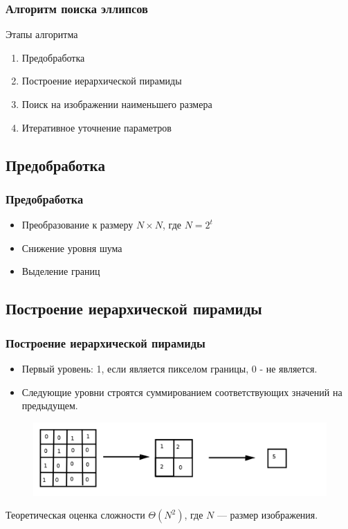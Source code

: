\documentclass[14pt]{beamer}
\begin{document}
\begin{frame}
\frametitle{Алгоритм поиска эллипсов}
\begin{block}{Этапы алгоритма}
\begin{enumerate}
  \item Предобработка
  \item Построение иерархической пирамиды
  \item Поиск на изображении наименьшего размера
  \item Итеративное уточнение параметров
\end{enumerate}
\end{block}
\end{frame}

\subsection{Предобработка}
\begin{frame}
\frametitle{Предобработка}
\begin{block}{}
\begin{itemize}
  \item Преобразование к размеру $N \times N$, где $N = 2^t$
  \item Снижение уровня шума
  \item Выделение границ
\end{itemize}
\end{block}
\end{frame}

\subsection{Построение иерархической пирамиды}
\begin{frame}
\frametitle{Построение иерархической пирамиды}
\begin{block}{}
\begin{itemize}
  \item Первый уровень: 1, если является пикселом границы, 0 - не является.
  \item Следующие уровни строятся суммированием соответствующих значений на предыдущем.
\end{itemize}
\end{block}
\begin{figure}[H]
  \center
  \includegraphics[width=0.7\linewidth]{pyramidcreation}
\end{figure}
\begin{block}{Теоретическая оценка сложности}
\(\Theta(N^2)\), где $N$ --- размер изображения.
\end{block}
\end{frame}
\end{document}
